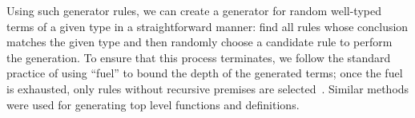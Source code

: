 
Using such generator rules, we can create a generator for random
well-typed terms of a given type in a straightforward manner: find all
rules whose conclusion matches the given type and then randomly choose
a candidate rule to perform the generation. To ensure that this
process terminates, we follow the standard practice of using ``fuel'' to
bound the depth of the generated terms; once the fuel is exhausted,
only rules without recursive premises are
selected~\cite{Pierce:SF4}. Similar methods were used for
generating top level functions and  definitions. 


